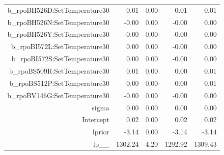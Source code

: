 \begin{table}[ht]
\begin{tabular}{rrrrr}
  b\_rpoBH526D:SetTemperature30 & 0.01 & 0.00 & 0.01 & 0.01 \\ 
  b\_rpoBH526N:SetTemperature30 & -0.00 & 0.00 & -0.00 & 0.00 \\ 
  b\_rpoBH526Y:SetTemperature30 & -0.00 & 0.00 & -0.00 & 0.00 \\ 
  b\_rpoBI572L:SetTemperature30 & 0.00 & 0.00 & -0.00 & 0.00 \\ 
  b\_rpoBI572S:SetTemperature30 & 0.00 & 0.00 & -0.00 & 0.00 \\ 
  b\_rpoBS509R:SetTemperature30 & 0.01 & 0.00 & 0.00 & 0.01 \\ 
  b\_rpoBS512P:SetTemperature30 & 0.00 & 0.00 & 0.00 & 0.01 \\ 
  b\_rpoBV146G:SetTemperature30 & -0.00 & 0.00 & -0.00 & 0.00 \\ 
  sigma & 0.00 & 0.00 & 0.00 & 0.00 \\ 
  Intercept & 0.02 & 0.00 & 0.02 & 0.02 \\ 
  lprior & -3.14 & 0.00 & -3.14 & -3.14 \\ 
  lp\_\_ & 1302.24 & 4.20 & 1292.92 & 1309.43 \\ 
   \hline
\end{tabular}
\end{table}
